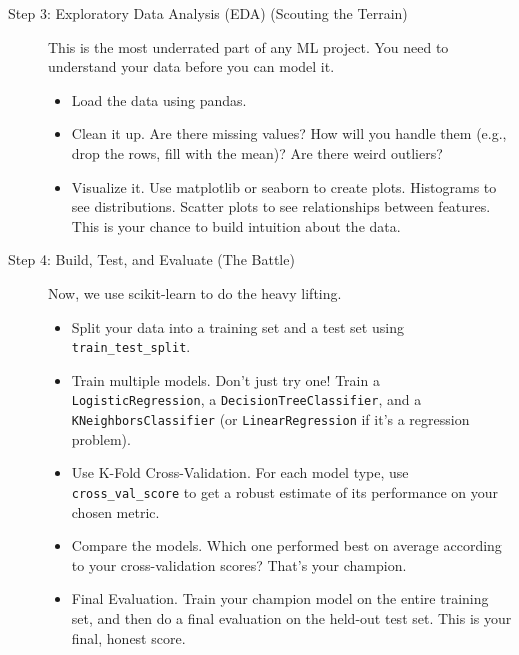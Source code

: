 \documentclass[11pt, letterpaper, openany]{book}
\begin{document}
\begin{description}
    \item[Step 3: Exploratory Data Analysis (EDA) (Scouting the Terrain)] This is the most underrated part of any ML project. You need to understand your data before you can model it.
    \begin{itemize}
        \item Load the data using pandas.
        \item Clean it up. Are there missing values? How will you handle them (e.g., drop the rows, fill with the mean)? Are there weird outliers?
        \item Visualize it. Use matplotlib or seaborn to create plots. Histograms to see distributions. Scatter plots to see relationships between features. This is your chance to build intuition about the data.
    \end{itemize}
    
    \item[Step 4: Build, Test, and Evaluate (The Battle)] Now, we use scikit-learn to do the heavy lifting.
    \begin{itemize}
        \item Split your data into a training set and a test set using \texttt{train\_test\_split}.
        \item Train multiple models. Don't just try one! Train a \texttt{LogisticRegression}, a \texttt{DecisionTreeClassifier}, and a \texttt{KNeighborsClassifier} (or \texttt{LinearRegression} if it's a regression problem).
        \item Use K-Fold Cross-Validation. For each model type, use \texttt{cross\_val\_score} to get a robust estimate of its performance on your chosen metric.
        \item Compare the models. Which one performed best on average according to your cross-validation scores? That's your champion.
        \item Final Evaluation. Train your champion model on the entire training set, and then do a final evaluation on the held-out test set. This is your final, honest score.
    \end{itemize}
    

\end{description}
\end{document}

